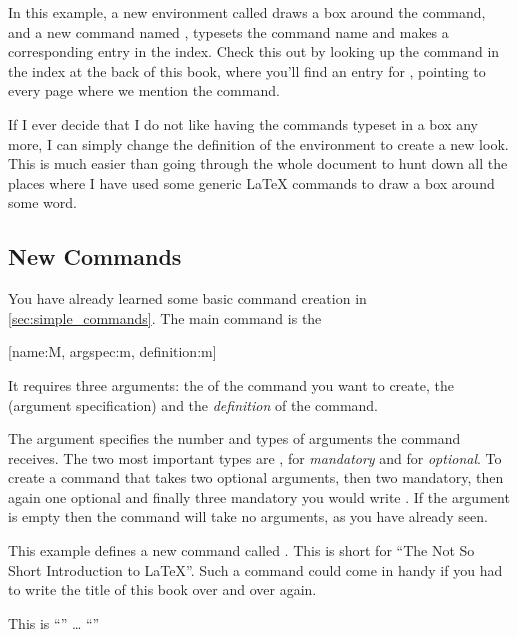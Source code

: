 \begin{example}
\begin{lscommand}
\end{lscommand}
\end{example}
In this example, a new environment called
 draws a box around the
command, and a new command named , typesets the command
name and makes a corresponding entry in the index. Check
this out by looking up the  command in the index at the back
of this book, where you'll find an entry for , pointing to
every page where we mention the  command.

If I ever decide that I do not like having the commands typeset in
a box any more, I can simply change the definition of the
 environment to create a new look. This is much
easier than going through the whole document to hunt down all the
places where I have used some generic \LaTeX{} commands to draw a
box around some word.

\subsection{New Commands}\label{sec:new_commands}

You have already learned some basic command creation in
\autoref{sec:simple_commands}. The main command is the
\begin{lscommand}
  [name:M, argspec:m, definition:m]
\end{lscommand}
It requires three arguments: the  of the command you want to create,
the  (argument specification) and the \emph{definition} of the
command.

The  argument specifies the number and types of arguments the
command receives. The two most important types are , for
\emph{mandatory} and  for \emph{optional}. To create a command that
takes two optional arguments, then two mandatory, then again one optional and
finally three mandatory you would write . If the 
argument is empty then the command will take no arguments, as you have already
seen.

This example defines a new command called . This is
short for \enquote{The Not So Short Introduction to \LaTeX}. Such a command
could come in handy if you had to write the title of this book over
and over again.

\begin{example}
This is \enquote{\tnss} \ldots{}
\enquote{\tnss}
\end{example}

